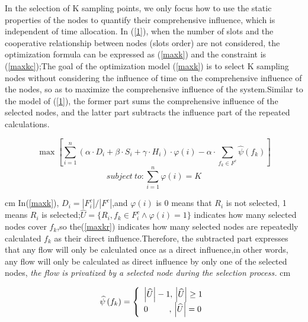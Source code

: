 \documentclass[conference]{IEEEtran}
\begin{document}
In the selection of K sampling points, we only focus how to use the static properties of the nodes to quantify their comprehensive influence, which is independent of time allocation. In (\ref{1}), when the number of slots and the cooperative relationship between nodes (slots order) are not considered, the optimization formula can be expressed as (\ref{maxk}) and the constraint is (\ref{maxkc});The goal of the optimization model (\ref{maxk}) is to select K sampling nodes without considering the influence of time on the comprehensive influence of the nodes, so as to maximize the comprehensive influence of the system.Similar to the model of (\ref{1}), the former part sums the comprehensive influence of the selected nodes, and the latter part subtracts the influence part of the repeated calculations.
\begin{spacing}{0.5}
\begin{small}
\begin{equation}
\max [\sum_{i=1}^n (\alpha \cdot {D_{i}} + \beta \cdot {S_{i}} + \gamma \cdot {H_{i}}) \cdot \varphi{(i)} - \alpha \cdot\sum_{f_k \in F^c} \widehat{\psi}{(f_k)}]
\label{maxk}
\end{equation}
\begin{equation}
subject \ to:\sum_{i=1}^{n} \varphi(i) = K
\label{maxkc}
\end{equation}
\end{small}
\end{spacing}
 cm
In(\ref{maxk}), $D_i=|F^c_i|/|F^c|$,and $\varphi(i)$ is 0 means that $R_i$ is not selected, 1 means $R_i$ is selected;$\widehat{U} = \{R_i,f_k \in F^c_i \wedge \varphi(i) = 1\}$ indicates how many selected nodes cover $f_k$,so the(\ref{maxkr}) indicates how many selected nodes are repeatedly calculated $f_k$ as their direct influence.Therefore, the subtracted part expresses that any flow will only be calculated once as a direct influence,in other words, any flow will only be calculated as direct influence by only one of the selected nodes, \emph{the flow is privatized by a selected node during the selection process.}
 cm
\begin{spacing}{0.5}
\begin{small}
\begin{equation}
\widehat{\psi} \left( {{f_k}} \right) = \left\{ \begin{array}{l}
\left| \widehat{U} \right| - 1,{\rm{    }}\left| \widehat{U} \right| \ge 1\\
{\rm{   }}0\quad \quad \; \; ,\, \left| \widehat{U} \right| = 0
\end{array} \right.
\label{maxkr}
\end{equation}
\end{small}
\end{spacing}
\end{document}
